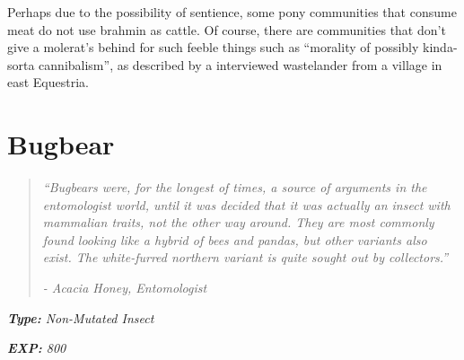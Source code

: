 \documentclass[11pt,a4paper,twocolumn]{book}
\begin{document}
	Perhaps due to the possibility of sentience, some pony communities that consume meat do not use brahmin as cattle. Of course, there are communities that don't give a molerat's behind for such feeble things such as ``morality of possibly kinda-sorta cannibalism'', as described by a interviewed wastelander from a village in east Equestria.
	
	\clearpage
	\section*{Bugbear}
	\begin{quote}
		\emph{``Bugbears were, for the longest of times, a source of arguments in the entomologist world, until it was decided that it was actually an insect with mammalian traits, not the other way around. They are most commonly found looking like a hybrid of bees and pandas, but other variants also exist. The white-furred northern variant is quite sought out by collectors.''}
		
		\emph{-	Acacia Honey, Entomologist}
	\end{quote}
	
	\noindent
	\emph{\textbf{Type:} Non-Mutated Insect}
	
	\noindent
	\emph{\textbf{EXP:} 800}
	
%		
%	
	
\end{document}
